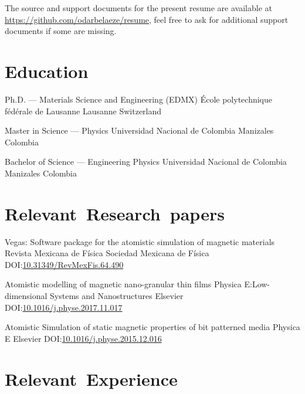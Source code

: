\documentclass[12pt,english,letter,sans]{moderncv}
\begin{document}
\maketitle

\begin{centering}
    The source and support documents for the present resume are available at
    \url{https://github.com/odarbelaeze/resume}, feel free to ask for
    additional support documents if some are missing.
\end{centering}


\section{Education}

        {Ph.D. --- Materials Science and Engineering (EDMX)}
        {École polytechnique fédérale de Lausanne}
        {Lausanne}
        {Switzerland}
        {}

        {Master in Science --- Physics}
        {Universidad Nacional de Colombia}
        {Manizales}
        {Colombia}
        {}

        {Bachelor of Science --- Engineering Physics}
        {Universidad Nacional de Colombia}
        {Manizales}
        {Colombia}
        {}


\section{Relevant~Research~papers}

        {Vegas: Software package for the atomistic simulation of magnetic materials}
        {Revista Mexicana de Física}
        {Sociedad Mexicana de Física}
        {DOI:\@ \href{https://doi.org/10.31349/RevMexFis.64.490}{10.31349/RevMexFis.64.490}}
        {}

        {Atomistic modelling of magnetic nano-granular thin films}
        {Physica E:\@ Low-dimensional Systems and Nanostructures}
        {Elsevier}
        {DOI:\@ \href{https://doi.org/10.1016/j.physe.2017.11.017}{10.1016/j.physe.2017.11.017}}
        {}

        {Atomistic Simulation of static magnetic properties of bit patterned media}
        {Physica E}
        {Elsevier}
        {DOI:\@ \href{https://doi.org/10.1016/j.physe.2015.12.016}{10.1016/j.physe.2015.12.016}}
        {}


\section{Relevant~Experience}
\end{document}
